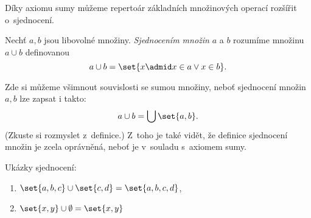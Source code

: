 Díky axiomu sumy můžeme repertoár základních množinových operací rozšířit o~sjednocení.
\begin{definition}\label{def:sjednoceni}
    Nechť $a,b$ jsou libovolné množiny. \emph{Sjednocením množin} $a$ a $b$ rozumíme množinu $a\cup b$ definovanou
    \begin{equation*}
        a\cup b=\set{x \admid x\in a \lor x\in b}.
    \end{equation*}
\end{definition}
Zde si můžeme všimnout souvislosti se sumou množiny, neboť sjednocení množin $a,b$ lze zapsat i takto:
\begin{equation*}
    a\cup b=\bigcup\set{a,b}.
\end{equation*}
(Zkuste si rozmyslet z~definice.) Z~toho je také vidět, že definice sjednocení množin je zcela oprávněná, neboť je v~souladu s~axiomem sumy.
\begin{example}
    Ukázky sjednocení:
    \begin{enumerate}[label=(\roman*)]
        \item $\set{a,b,c}\cup\set{c,d}=\set{a,b,c,d}$,
        \item $\set{x,y}\cup\emptyset=\set{x,y}$
    \end{enumerate}
\end{example}

